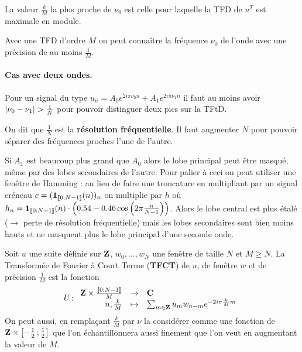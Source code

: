 \begin{thm}
	La valeur $\frac{k}{M}$ la plus proche de $\nu_0$ est celle pour laquelle la TFD de $u^T$ est maximale en module.
\end{thm}

\begin{pop}
	Avec une TFD d'ordre $M$ on peut connaître la fréquence $\nu_0$ de l'onde avec une précision de au moins $\frac{1}{M}$.
\end{pop}

\paragraph{Cas avec deux ondes.}
Pour un signal du type $u_n = A_0 e^{2i\pi \nu_0 n} + A_1 e^{2i\pi \nu_1 n}$ il faut au moins avoir $\left\lvert\nu_0 - \nu_1\right\rvert > \frac{1}{N}$ pour pouvoir distinguer deux pics sur la TFtD.

\begin{voc}
	On dit que $\frac{1}{N}$ est la \textbf{résolution fréquentielle}.
	Il faut augmenter $N$ pour pouvoir séparer des fréquences proches l'une de l'autre.
\end{voc}

Si $A_1$ est beaucoup plus grand que $A_0$ alors le lobe principal peut être masqué, même par des lobes secondaires de l'autre.
Pour palier à ceci on peut utiliser une fenêtre de Hamming : au lieu de faire une troncature en multipliant par un signal créneau $c = (\operatorname{\mathbf{1}}_{\mathopen{}\mathclose{\left[\![0\mathclose{}\mathpunct{};N - 1\right]\!]}}(n))_n$ on multiplie par $h$ où $h_n = \operatorname{\mathbf{1}}_{\mathopen{}\mathclose{\left[\![0\mathclose{}\mathpunct{};N - 1\right]\!]}}(n) \cdot \left( 0.54 - 0.46 \cos \left( 2\pi \frac{n}{N - 1} \right) \right)$.
Alors le lobe central est plus étalé ($\rightarrow$ perte de résolution fréquentielle) mais les lobes secondaires sont bien moins hauts et ne masquent plus le lobe principal d'une seconde onde.

\begin{defn}
	Soit $u$ une suite définie sur $\mathbf{Z}$, $w_0,\ldots,w_N$ une fenêtre de taille $N$ et $M \geq N$.
	La Transformée de Fourier à Court Terme (\textbf{TFCT}) de $u$, de fenêtre $w$ et de précision $\frac{1}{M}$ est la fonction
	$$U \colon \begin{array}{rcl}
		\mathbf{Z} \times \frac{\mathopen{}\mathclose{\left[\![0\mathclose{}\mathpunct{};N - 1\right]\!]}}{M} & \to & \mathbf{C} \\
		n, \frac{k}{M} & \mapsto & \sum_{m \in \mathbf{Z}} u_m w_{n - m} e^{-2i\pi \frac{k}{M} m}
	\end{array}$$
	On peut aussi, en remplaçant $\frac{k}{M}$ par $\nu$ la considérer comme une fonction de $\mathbf{Z} \times \mathopen{}\mathclose{\left[-\frac{1}{2}\mathclose{}\mathpunct{};\frac{1}{2}\right]}$ que l'on échantillonnera aussi finement que l'on veut en augmentant la valeur de $M$.
\end{defn}

